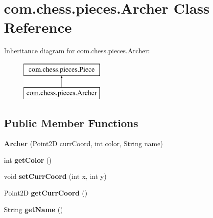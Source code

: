 \hypertarget{classcom_1_1chess_1_1pieces_1_1_archer}{}\section{com.\+chess.\+pieces.\+Archer Class Reference}
\label{classcom_1_1chess_1_1pieces_1_1_archer}
Inheritance diagram for com.\+chess.\+pieces.\+Archer\+:\begin{figure}[H]
\begin{center}
\leavevmode
\includegraphics[height=2.000000cm]{classcom_1_1chess_1_1pieces_1_1_archer}
\end{center}
\end{figure}
\subsection*{Public Member Functions}
\begin{DoxyCompactItemize}
\item 
\mbox{\label{classcom_1_1chess_1_1pieces_1_1_archer_a38aec84dccd60a70bd667b4fa0c01393}} 
{\bfseries Archer} (Point2D curr\+Coord, int color, String name)
\item 
\mbox{\label{classcom_1_1chess_1_1pieces_1_1_archer_aa8426b1f8517e4b8a83b203783df3ab3}} 
int {\bfseries get\+Color} ()
\item 
\mbox{\label{classcom_1_1chess_1_1pieces_1_1_archer_aaab3d979f459e54493b6ede79eb80fed}} 
void {\bfseries set\+Curr\+Coord} (int x, int y)
\item 
\mbox{\label{classcom_1_1chess_1_1pieces_1_1_archer_a676671569ea4def3a10003a766433d91}} 
Point2D {\bfseries get\+Curr\+Coord} ()
\item 
\mbox{\label{classcom_1_1chess_1_1pieces_1_1_archer_ad694e1a828f80cc9d6a29c4294eac10f}} 
String {\bfseries get\+Name} ()
\end{DoxyCompactItemize}


